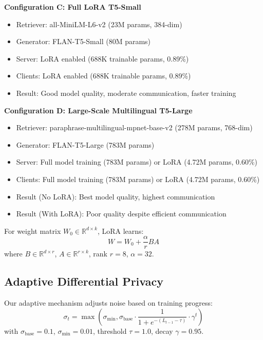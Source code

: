 \documentclass[conference]{IEEEtran}
\begin{document}
\textbf{Configuration C: Full LoRA T5-Small}
\begin{itemize}
    \item Retriever: all-MiniLM-L6-v2 (23M params, 384-dim)
    \item Generator: FLAN-T5-Small (80M params)
    \item Server: LoRA enabled (688K trainable params, 0.89\%)
    \item Clients: LoRA enabled (688K trainable params, 0.89\%)
    \item Result: Good model quality, moderate communication, faster training
\end{itemize}

\textbf{Configuration D: Large-Scale Multilingual T5-Large}
\begin{itemize}
    \item Retriever: paraphrase-multilingual-mpnet-base-v2 (278M params, 768-dim)
    \item Generator: FLAN-T5-Large (783M params)
    \item Server: Full model training (783M params) or LoRA (4.72M params, 0.60\%)
    \item Clients: Full model training (783M params) or LoRA (4.72M params, 0.60\%)
    \item Result (No LoRA): Best model quality, highest communication
    \item Result (With LoRA): Poor quality despite efficient communication
\end{itemize}

For weight matrix $W_0 \in \mathbb{R}^{d \times k}$, LoRA learns:
\begin{equation}
W = W_0 + \frac{\alpha}{r} BA
\end{equation}
where $B \in \mathbb{R}^{d \times r}$, $A \in \mathbb{R}^{r \times k}$, rank $r=8$, $\alpha=32$.

\subsection{Adaptive Differential Privacy}

Our adaptive mechanism adjusts noise based on training progress:
\begin{equation}
\sigma_t = \max\left(\sigma_{\min}, \sigma_{\text{base}} \cdot \frac{1}{1 + e^{-(L_{t-1} - \tau)}} \cdot \gamma^t\right)
\end{equation}
with $\sigma_{\text{base}}=0.1$, $\sigma_{\min}=0.01$, threshold $\tau=1.0$, decay $\gamma=0.95$.
\end{document}
